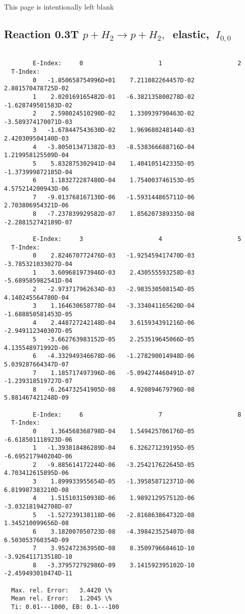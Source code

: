\documentclass[12pt,dvipdfmx]{article}
\begin{document}
\newpage
This page is intentionally left blank
\newpage


\subsection{
Reaction 0.3T  $p + H_2 \rightarrow  p + H_2 ,\ $  elastic,
$\  I_{0,0}$
}

\begin{small}\begin{verbatim}

        E-Index:     0                     1                     2
  T-Index:
        0   -1.850658754996D+01    7.211082264457D-02    2.881570478725D-02
        1    2.020169165482D-01   -6.382135800278D-02   -1.628749501583D-02
        2    2.598024510290D-02    1.330939790463D-02   -3.589374170071D-03
        3   -1.678447543630D-02    1.969680248144D-03    2.420309504140D-03
        4   -3.805013471382D-03   -8.538366688716D-04    1.219958125509D-04
        5    5.832875302941D-04    1.404105142335D-05   -1.373999872185D-04
        6    1.183272287480D-04    1.754003746153D-05    4.575214200943D-06
        7   -9.013768167130D-06   -1.593144865711D-06    2.703806954321D-06
        8   -7.237839929582D-07    1.856207389335D-08   -2.288152742189D-07

        E-Index:     3                     4                     5
  T-Index:
        0    2.824670772476D-03   -1.925459417470D-03   -3.785321033027D-04
        1    3.609681973946D-03    2.430555593258D-03   -5.689585982541D-04
        2   -2.973717962634D-03   -2.983530508154D-05    4.140245564780D-04
        3    1.164630658778D-04   -3.334041165620D-04   -1.688850581453D-05
        4    2.448727242148D-04    3.615934391216D-06   -2.949112340307D-05
        5   -3.662763983152D-05    2.253519645066D-05    4.135548971992D-06
        6   -4.332949346678D-06   -1.278290014948D-06    5.039287664347D-07
        7    1.185717497396D-06   -5.094274460491D-07   -1.239318519727D-07
        8   -6.264732541905D-08    4.920894679796D-08    5.881467421248D-09

        E-Index:     6                     7                     8
  T-Index:
        0    1.364568368798D-04    1.549425706176D-05   -6.618501118923D-06
        1   -1.393818486289D-04    6.326271239195D-05   -6.695217940204D-06
        2   -9.885614172244D-06   -3.254217622645D-05    4.703412615895D-06
        3    1.899933955654D-05   -1.395858712371D-06    6.819987383210D-08
        4    1.515103150938D-06    1.989212957512D-06   -3.032181942708D-07
        5   -1.527239138118D-06   -2.816863864732D-08    1.345210099656D-08
        6    3.182007050723D-08   -4.398423525407D-08    6.503053760354D-09
        7    3.952472363950D-08    8.350979668461D-10   -3.926411713518D-10
        8   -3.379572792986D-09    3.141592395102D-10   -2.459493010474D-11

  Max. rel. Error:   3.4420 \%
  Mean rel. Error:   1.2045 \%
  Ti: 0.01---1000, EB: 0.1---100
\end{verbatim}\end{small}
\end{document}
